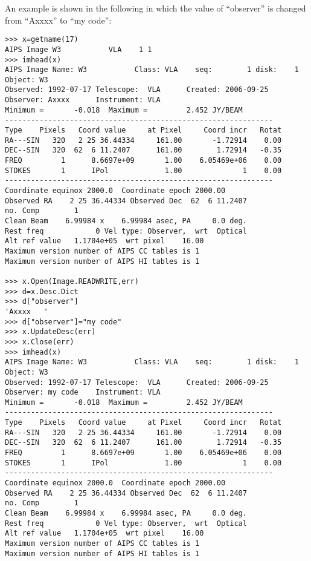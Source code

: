 \documentclass[11pt]{report}
\begin{document}
An example is shown in the following in which the value of
``observer'' is changed from ``Axxxx'' to ``my code'':
\begin{verbatim}
>>> x=getname(17)
AIPS Image W3           VLA    1 1
>>> imhead(x)
AIPS Image Name: W3           Class: VLA    seq:        1 disk:    1
Object: W3      
Observed: 1992-07-17 Telescope:  VLA      Created: 2006-09-25
Observer: Axxxx      Instrument: VLA      
Minimum =       -0.018  Maximum =         2.452 JY/BEAM 
--------------------------------------------------------------
Type    Pixels   Coord value     at Pixel     Coord incr   Rotat
RA---SIN   320   2 25 36.44334     161.00       -1.72914    0.00
DEC--SIN   320  62  6 11.2407      161.00        1.72914   -0.35
FREQ         1      8.6697e+09       1.00    6.05469e+06    0.00
STOKES       1      IPol             1.00              1    0.00
--------------------------------------------------------------
Coordinate equinox 2000.0  Coordinate epoch 2000.00
Observed RA    2 25 36.44334 Observed Dec  62  6 11.2407 
no. Comp        1
Clean Beam    6.99984 x    6.99984 asec, PA     0.0 deg.
Rest freq            0 Vel type: Observer,  wrt  Optical
Alt ref value   1.1704e+05  wrt pixel    16.00
Maximum version number of AIPS CC tables is 1 
Maximum version number of AIPS HI tables is 1 

>>> x.Open(Image.READWRITE,err)
>>> d=x.Desc.Dict
>>> d["observer"]
'Axxxx   '
>>> d["observer"]="my code"
>>> x.UpdateDesc(err)
>>> x.Close(err)
>>> imhead(x)
AIPS Image Name: W3           Class: VLA    seq:        1 disk:    1
Object: W3      
Observed: 1992-07-17 Telescope:  VLA      Created: 2006-09-25
Observer: my code    Instrument: VLA      
Minimum =       -0.018  Maximum =         2.452 JY/BEAM 
--------------------------------------------------------------
Type    Pixels   Coord value     at Pixel     Coord incr   Rotat
RA---SIN   320   2 25 36.44334     161.00       -1.72914    0.00
DEC--SIN   320  62  6 11.2407      161.00        1.72914   -0.35
FREQ         1      8.6697e+09       1.00    6.05469e+06    0.00
STOKES       1      IPol             1.00              1    0.00
--------------------------------------------------------------
Coordinate equinox 2000.0  Coordinate epoch 2000.00
Observed RA    2 25 36.44334 Observed Dec  62  6 11.2407 
no. Comp        1
Clean Beam    6.99984 x    6.99984 asec, PA     0.0 deg.
Rest freq            0 Vel type: Observer,  wrt  Optical
Alt ref value   1.1704e+05  wrt pixel    16.00
Maximum version number of AIPS CC tables is 1 
Maximum version number of AIPS HI tables is 1 
\end{verbatim}
\end{document}
